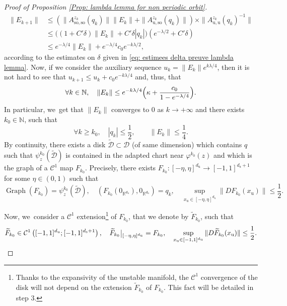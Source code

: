 \documentclass[JEP,XML,SOM,Unicode,NoEqCountersInSection,NoFloatCountersInSection,published]{cedram}
\newcommand{\rs}{\mathrm{s}}
\newcommand{\rso}{\mathrm{so}}
\newcommand{\ru}{\mathrm{u}}
\theoremstyle{definition}
\theoremstyle{plain}
\newcommand{\Ccal}{\mathcal{C}}
\newcommand{\D}{\mathcal{D}}
\newcommand{\N}{\mathbb{N}}
\newcommand{\R}{\mathbb{R}}
\DeclareMathOperator{\Graph}{Graph}
\def\rest#1#2{\mathchoice
{\setbox1\hbox{${\displaystyle #1}_{\scriptstyle #2}$}
\restrictionaux{#1}{#2}}
{\setbox1\hbox{${\textstyle #1}_{\scriptstyle #2}$}
\restrictionaux{#1}{#2}}
{\setbox1\hbox{${\scriptstyle #1}_{\scriptscriptstyle #2}$}
\restrictionaux{#1}{#2}}
{\setbox1\hbox{${\scriptscriptstyle #1}_{\scriptscriptstyle #2}$}
\restrictionaux{#1}{#2}}}
\def\restrictionaux#1#2{{#1\,\smash{\vrule height.8\ht1 depth.85\dp1}}_{\,#2}}
\begin{document}
\begin{appendix}
\begin{proof}[Proof of Proposition \ref{Prop: lambda lemma for non periodic orbit}]
\begin{align*}
\|E_{k+1}\| &\leq \left(\|A_{\rso,\rso}^{z_k} (q_k) \| \|E_k \| + \| A_{\ru,\rso}^{z_k} (q_k) \| \right) \times \| A_{\ru,\ru}^{z_k} (q_k)^{-1}\| \\
&\leq \big((1 + C' \delta) \|E_k \| + C' \delta |q_k| \big) (e^{-\lambda/ 2} + C' \delta) \\
&\leq e^{- \lambda /4} \|E_k \| + e^{- \lambda /4 } c_0 e^{-k \lambda/ 2},
\end{align*}
according to the estimates on $\delta$ given in \eqref{eq: estimees delta preuve lambda lemma}.
Now, if we consider the auxiliary sequence $u_k = \| E_k \| e^{k \lambda / 4}$, then it is not hard to see that $u_{k + 1} \leq u_k + c_0 e^{-k \lambda /4}$ and, thus, that
\[
\forall k \in \N, \quad \|E_k \| \leq e^{- k \lambda /4} \Bigl(\kappa + \frac{c_0}{1 - e^{-\lambda/ 4}} \Bigr).
\]
In particular, we~get that $\|E_k \|$ converges to $0$ as $k \to +\infty$ and there exists $k_{0} \in \N$, such that
\[
\forall k \geq k_0, \quad |q_k| \leq \frac{1}{2}, \qquad \|E_k \| \leq \frac{1}{4}.
\]
By continuity, there exists a disk $\widetilde{\D} \subset \D$ (of same dimension) which contains $q$ such that $\psi_z^{k_0} (\widetilde{\D})$ is contained in the adapted chart near $\varphi^{k_0} (z)$ and which is the graph of a $\Ccal^{1}$ map $F_{k_0}$. Precisely, there exists $F_{k_0}: [-\eta, \eta]^{d_\ru} \to [-1,1]^{d_\rs + 1}$ for some $\eta \in (0, 1)$ such that
\[
\Graph (F_{k_0}) = \psi_z^{k_0} (\widetilde{\D}), \quad \left(F_{k_0} (0_{\R^{d_\ru}}), 0_{\R^{d_\ru}}\right) = q_k, \quad \sup_{x_\ru \in [-\eta, \eta]^{d_\ru}}\|D F_{k_0} (x_\ru) \| \leq \frac{1}{2}.
\]

Now, we~consider a $\Ccal^1$ extension\footnote{Thanks to the expansivity of the unstable manifold, the $\Ccal^1$ convergence of the disk will not depend on the extension $\widetilde{F}_{k_0}$ of $F_{k_0}$. This fact will be detailed in step 3.} of $F_{k_0}$, that we denote by $\widetilde{F}_{k_0}$, such that
\[
\widetilde{F}_{k_0} \in \Ccal^1 \left([-1,1]^{d_\ru}; [-1,1]^{d_\rs + 1} \right), \quad \rest{\widetilde{F}_{k_0}}{[-\eta, \eta]^{d_\ru}}= F_{k_0}, \quad \sup_{x_\ru \in [-1, 1]^{d_\ru}}\|D \widetilde{F}_{k_0} (x_\ru) \| \leq \frac{1}{2}.
\]


\end{proof}
\end{appendix}
\end{document}
